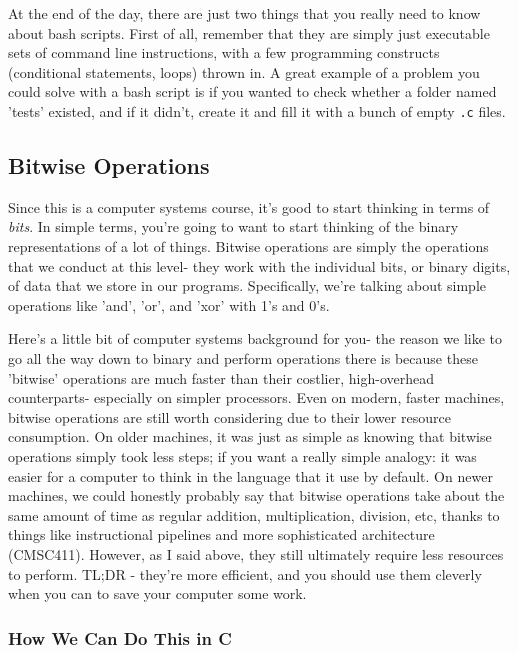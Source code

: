 \documentclass[english, 10pt]{article}
\begin{document}
At the end of the day, there are just two things that you really need to know about bash scripts. First of all, remember that they are simply just executable sets of command line instructions, with a few programming constructs (conditional statements, loops) thrown in. A great example of a problem you could solve with a bash script is if you wanted to check whether a folder named 'tests' existed, and if it didn't, create it and fill it with a bunch of empty \texttt{.c} files.

\subsection{Bitwise Operations}

Since this is a computer systems course, it's good to start thinking in terms of \textit{bits}. In simple terms, you're going to want to start thinking of the binary representations of a lot of things. Bitwise operations are simply the operations that we conduct at this level- they work with the individual bits, or binary digits, of data that we store in our programs. Specifically, we're talking about simple operations like 'and', 'or', and 'xor' with 1's and 0's.\newline

Here's a little bit of computer systems background for you- the reason we like to go all the way down to binary and perform operations there is because these 'bitwise' operations are much faster than their costlier, high-overhead counterparts- especially on simpler processors. Even on modern, faster machines, bitwise operations are still worth considering due to their lower resource consumption. On older machines, it was just as simple as knowing that bitwise operations simply took less steps; if you want a really simple analogy: it was easier for a computer to think in the language that it use by default. On newer machines, we could honestly probably say that bitwise operations take about the same amount of time as regular addition, multiplication, division, etc, thanks to things like instructional pipelines and more sophisticated architecture (CMSC411). However, as I said above, they still ultimately require less resources to perform. TL;DR - they're more efficient, and you should use them cleverly when you can to save your computer some work.\newline

\subsubsection{How We Can Do This in C}
\end{document}
